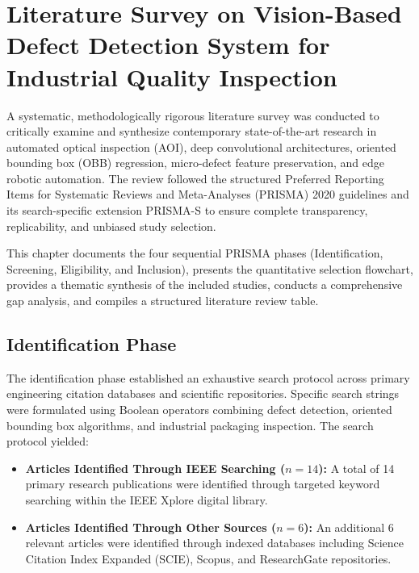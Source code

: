 \chapter{Literature Survey on Vision-Based Defect Detection System for Industrial Quality Inspection}
\label{ch:lit}

A systematic, methodologically rigorous literature survey was conducted to critically examine and synthesize contemporary state-of-the-art research in automated optical inspection (AOI), deep convolutional architectures, oriented bounding box (OBB) regression, micro-defect feature preservation, and edge robotic automation. The review followed the structured Preferred Reporting Items for Systematic Reviews and Meta-Analyses (PRISMA) 2020 guidelines and its search-specific extension PRISMA-S to ensure complete transparency, replicability, and unbiased study selection.

This chapter documents the four sequential PRISMA phases (Identification, Screening, Eligibility, and Inclusion), presents the quantitative selection flowchart, provides a thematic synthesis of the included studies, conducts a comprehensive gap analysis, and compiles a structured literature review table.

\section{Identification Phase}
\label{sec:identification}

The identification phase established an exhaustive search protocol across primary engineering citation databases and scientific repositories. Specific search strings were formulated using Boolean operators combining defect detection, oriented bounding box algorithms, and industrial packaging inspection. The search protocol yielded:

\begin{itemize}
\item \textbf{Articles Identified Through IEEE Searching ($n = 14$):} A total of 14 primary research publications were identified through targeted keyword searching within the IEEE Xplore digital library.
\item \textbf{Articles Identified Through Other Sources ($n = 6$):} An additional 6 relevant articles were identified through indexed databases including Science Citation Index Expanded (SCIE), Scopus, and ResearchGate repositories.
\end{itemize}

